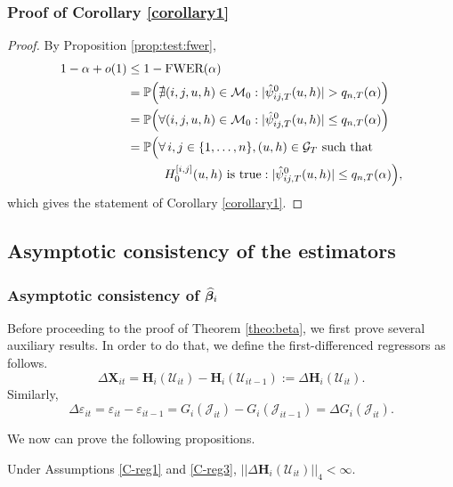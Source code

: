 \documentclass[a4paper,12pt]{article}
\begin{document}
\subsubsection*{Proof of Corollary \ref{corollary1}}\label{subsec:app:corollary}
\begin{proof}
By Proposition \ref{prop:test:fwer}, 
\begin{align*}
1 - \alpha + o(1) 
 & \le 1 - \textnormal{FWER}(\alpha) \\
 & = \mathbb{P} \Big( \nexists (i,j,u, h) \in \mathcal{M}_0: |\hat{\psi}^0_{ij,T}(u, h)| > q_{n, T}(\alpha) \Big) \\
& = \mathbb{P}\Big( \forall (i,j,u, h) \in \mathcal{M}_0: |\hat{\psi}^0_{ij,T}(u, h)| \le q_{n, T}(\alpha) \Big)\\
&=\mathbb{P}\Big( \forall \, i,j \in \{1, \ldots, n\}, (u, h) \in \mathcal{G}_T \text{ such that }\\
&\quad\quad \quad H_0^{[i, j]}(u, h) \text{ is true}: |\hat{\psi}^0_{ij,T}(u, h)| \le q_{n,T}(\alpha) \Big),
\end{align*}
which gives the statement of Corollary \ref{corollary1}.
\end{proof}


\subsection{Asymptotic consistency of the estimators}

\subsubsection{Asymptotic consistency of $\widehat{\bm{\beta}}_i$}\label{subsec:app:beta}

Before proceeding to the proof of Theorem \ref{theo:beta}, we first prove several auxiliary results. In order to do that, we define the first-differenced regressors as follows.
\[ \Delta \mathbf{X}_{it} =\mathbf{H}_i(\mathcal{U}_{it}) - \mathbf{H}_i(\mathcal{U}_{it-1}) := \Delta \mathbf{H}_i(\mathcal{U}_{it}). \]
Similarly, 
\[\Delta \varepsilon_{it} = \varepsilon_{it} - \varepsilon_{it-1} = G_i(\mathcal{J}_{it}) - G_i(\mathcal{J}_{it-1}) = \Delta G_i(\mathcal{J}_{it}).
\]
 
We now can prove the following propositions.
\begin{propA}\label{propA:beta1}
Under Assumptions \ref{C-reg1} and \ref{C-reg3}, $|| \Delta \mathbf{H}_i(\mathcal{U}_{it})||_4 < \infty$.
\end{propA}
\end{document}
